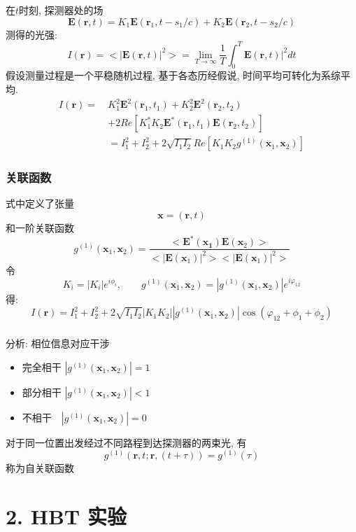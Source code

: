 \begin{frame} 
\frametitle{}
    在$t$时刻, 探测器处的场
    \[ \mathbf{E}(\mathbf{r},t) = K_1\mathbf{E}(\mathbf{r}_1,t-s_1/c) + K_2\mathbf{E}(\mathbf{r}_2,t-s_2/c)\]
    测得的光强:
    \[ I (\mathbf{r}) = <|\mathbf{E}(\mathbf{r},t)|^2> = \lim_{T\to \infty} \frac{1}{T}\int_0 ^T \mathbf{E}(\mathbf{r},t)|^2 dt\]
    假设测量过程是一个平稳随机过程, 基于各态历经假说, 时间平均可转化为系综平均.
    \[ \begin{aligned}
        I (\mathbf{r}) =~&K^2 _1\mathbf{E}^2(\mathbf{r}_1,t_1) + K^2 _2\mathbf{E}^2(\mathbf{r}_2,t_2)\\
        &+ 2 Re{[K^* _1 K _2 \mathbf{E}^*(\mathbf{r}_1,t_1)\mathbf{E}(\mathbf{r}_2,t_2)]}\\
        &= I^2_1 + I^2_2 + 2\sqrt{I_1 I_2}Re{[K_1 K _2 g^{(1)}(\mathbf{x}_1, \mathbf{x}_2)]}
    \end{aligned}\] 
\end{frame}

\begin{frame} 
\frametitle{关联函数}
    式中定义了张量
    \[ \mathbf{x}= (\mathbf{r},t)\]
    和一阶关联函数
    \[g^{(1)}(\mathbf{x}_1, \mathbf{x}_2) = \frac{<\mathbf{E}^*(\mathbf{x_1}) \mathbf{E}(\mathbf{x}_2) >}{<|\mathbf{E}(\mathbf{x}_1)|^2><|\mathbf{E}(\mathbf{x}_1)|^2>}\]
    令 
    \[K_i = |K_i| e^ {i\phi_i}, \qquad g^{(1)}(\mathbf{x}_1, \mathbf{x}_2) = |g^{(1)}(\mathbf{x}_1, \mathbf{x}_2)| e^ {i\varphi_{12}}\]
    得:
    \[ I (\mathbf{r}) = I^2_1 + I^2_2 + 2\sqrt{I_1 I_2}|K_1 K _2| |g^{(1)}(\mathbf{x}_1, \mathbf{x}_2)| \cos(\varphi_{12}+ \phi_1 + \phi_2)\] 
\end{frame}

\begin{frame} 
\frametitle{}
    分析: 相位信息对应干涉
    \begin{itemize}
        \item 完全相干 $|g^{(1)}(\mathbf{x}_1, \mathbf{x}_2)|=1$
        \item 部分相干 $|g^{(1)}(\mathbf{x}_1, \mathbf{x}_2)| < 1$
        \item 不相干 $~~~|g^{(1)}(\mathbf{x}_1, \mathbf{x}_2)| =0 $
    \end{itemize}
    对于同一位置出发经过不同路程到达探测器的两束光, 有
    \[g^{(1)}(\mathbf{r}, t; \mathbf{r}, (t+\tau) )= g^{(1)} (\tau)\]
    称为自关联函数
\end{frame}

\section{2. HBT 实验}


